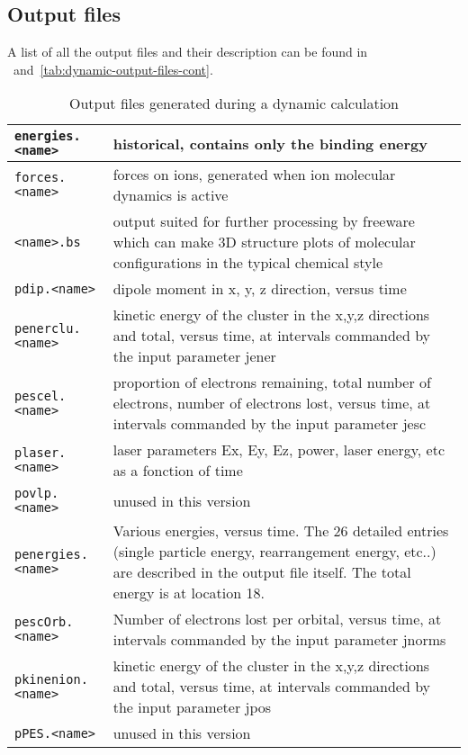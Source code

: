 \documentclass[11pt,a4paper]{article}
\begin{document}
		\subsection{Output files}
		
			A list of all the output files and their description can be found in ~and~\ref{tab:dynamic-output-files-cont}.
			
			\begin{table}[!htbp]
				\caption{Output files generated during a dynamic calculation}\label{tab:dynamic-output-files}
				\begin{tabular}{|p{4.5cm}|p{10.2cm}|}
					\hline
					\texttt{energies.<name>} & historical, contains only the binding energy\\
					\hline
					\texttt{forces.<name>} & forces on ions, generated when ion molecular dynamics is active\\
					\hline
					\texttt{<name>.bs} & output suited for further processing by freeware which  can make 3D structure plots of molecular configurations in the typical chemical style\\
					\hline
					\texttt{pdip.<name>} &  dipole moment in x, y, z direction, versus time \\
					\hline
					\texttt{penerclu.<name>} & kinetic energy of the cluster in the x,y,z directions and total, versus time, at intervals commanded by the input parameter jener\\
					\hline
					\texttt{pescel.<name>} & proportion of electrons remaining, total number of electrons, number of electrons lost, versus time, at intervals commanded by the input parameter jesc\\
					\hline
					\texttt{plaser.<name>} & laser parameters Ex, Ey, Ez, power, laser energy, etc as a fonction of time\\
					\hline
					\texttt{povlp.<name>} & unused in this version\\
					\hline
					\texttt{penergies.<name>} & Various energies, versus time. The 26 detailed entries (single particle energy, rearrangement energy, etc..) are described in the output file itself. The total energy is at location 18. \\
					\hline
					\texttt{pescOrb.<name>} & Number of electrons lost per orbital, versus time, at intervals commanded by the input parameter jnorms \\
					\hline
					\texttt{pkinenion.<name>} & kinetic energy of the cluster in the x,y,z directions and total, versus time, at intervals commanded by the input parameter jpos\\
					\hline
					\texttt{pPES.<name>} & unused in this version\\
					\hline
				\end{tabular}
			\end{table}
\end{document}
